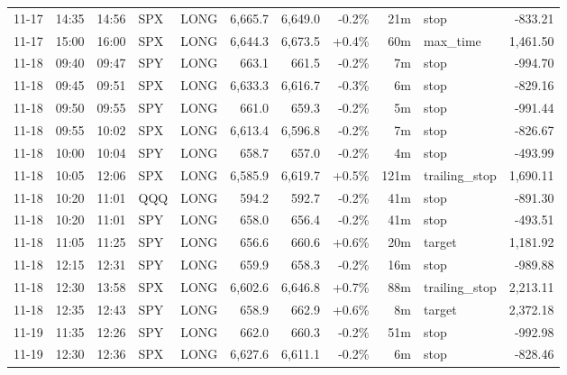 \documentclass[11pt,a4paper,twoside]{article}
\begin{document}
\begin{center}
\begin{longtable}{>{\color{txtmain}}l l l l l r r r r >{\color{txtmain}}l r}
11-17 & 14:35 & 14:56 & SPX & LONG & 6,665.7 & 6,649.0 & \textcolor{lossred}{-0.2\%} & 21m & stop & \textcolor{lossred}{-833.21} \\
11-17 & 15:00 & 16:00 & SPX & LONG & 6,644.3 & 6,673.5 & \textcolor{wingreen}{+0.4\%} & 60m & max\_time & \textcolor{wingreen}{1,461.50} \\
11-18 & 09:40 & 09:47 & SPY & LONG & 663.1 & 661.5 & \textcolor{lossred}{-0.2\%} & 7m & stop & \textcolor{lossred}{-994.70} \\
11-18 & 09:45 & 09:51 & SPX & LONG & 6,633.3 & 6,616.7 & \textcolor{lossred}{-0.3\%} & 6m & stop & \textcolor{lossred}{-829.16} \\
11-18 & 09:50 & 09:55 & SPY & LONG & 661.0 & 659.3 & \textcolor{lossred}{-0.2\%} & 5m & stop & \textcolor{lossred}{-991.44} \\
11-18 & 09:55 & 10:02 & SPX & LONG & 6,613.4 & 6,596.8 & \textcolor{lossred}{-0.2\%} & 7m & stop & \textcolor{lossred}{-826.67} \\
11-18 & 10:00 & 10:04 & SPY & LONG & 658.7 & 657.0 & \textcolor{lossred}{-0.2\%} & 4m & stop & \textcolor{lossred}{-493.99} \\
11-18 & 10:05 & 12:06 & SPX & LONG & 6,585.9 & 6,619.7 & \textcolor{wingreen}{+0.5\%} & 121m & trailing\_stop & \textcolor{wingreen}{1,690.11} \\
11-18 & 10:20 & 11:01 & QQQ & LONG & 594.2 & 592.7 & \textcolor{lossred}{-0.2\%} & 41m & stop & \textcolor{lossred}{-891.30} \\
11-18 & 10:20 & 11:01 & SPY & LONG & 658.0 & 656.4 & \textcolor{lossred}{-0.2\%} & 41m & stop & \textcolor{lossred}{-493.51} \\
11-18 & 11:05 & 11:25 & SPY & LONG & 656.6 & 660.6 & \textcolor{wingreen}{+0.6\%} & 20m & target & \textcolor{wingreen}{1,181.92} \\
11-18 & 12:15 & 12:31 & SPY & LONG & 659.9 & 658.3 & \textcolor{lossred}{-0.2\%} & 16m & stop & \textcolor{lossred}{-989.88} \\
11-18 & 12:30 & 13:58 & SPX & LONG & 6,602.6 & 6,646.8 & \textcolor{wingreen}{+0.7\%} & 88m & trailing\_stop & \textcolor{wingreen}{2,213.11} \\
11-18 & 12:35 & 12:43 & SPY & LONG & 658.9 & 662.9 & \textcolor{wingreen}{+0.6\%} & 8m & target & \textcolor{wingreen}{2,372.18} \\
11-19 & 11:35 & 12:26 & SPY & LONG & 662.0 & 660.3 & \textcolor{lossred}{-0.2\%} & 51m & stop & \textcolor{lossred}{-992.98} \\
11-19 & 12:30 & 12:36 & SPX & LONG & 6,627.6 & 6,611.1 & \textcolor{lossred}{-0.2\%} & 6m & stop & \textcolor{lossred}{-828.46} \\

\end{longtable}
\end{center}
\end{document}
